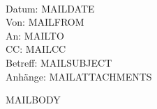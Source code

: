 ﻿\documentclass{scrartcl}
\begin{document}
\begin{tabbing}
\hspace{3cm} \= \\
Datum: \> MAILDATE \\
Von: \> MAILFROM \\
An: \> MAILTO \\
CC: \> MAILCC \\
Betreff: \> MAILSUBJECT \\
Anhänge: \> MAILATTACHMENTS \\
\end{tabbing}

MAILBODY
\end{document}
